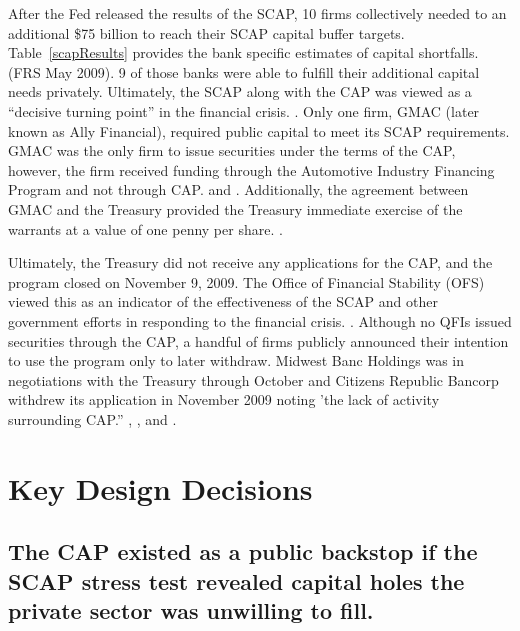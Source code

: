 \documentclass[12pt]{article}
\begin{document}
After the Fed released the results of the SCAP, 10 firms collectively needed to an additional \$75 billion to reach their SCAP capital buffer targets. Table~\ref{scapResults} provides the bank specific estimates of capital shortfalls. (FRS May 2009). 9 of those banks were able to fulfill their additional capital needs privately. Ultimately, the SCAP along with the CAP was viewed as a ``decisive turning point'' in the financial crisis. \citep{Bernanke}. Only one firm, GMAC (later known as Ally Financial), required public capital to meet its SCAP requirements. GMAC was the only firm to issue securities under the terms of the CAP, however, the firm received funding through the Automotive Industry Financing Program and not through CAP. \citep{OFS} and \citep{GW}. Additionally, the agreement between GMAC and the Treasury provided the Treasury immediate exercise of the warrants at a value of one penny per share. \citep{GW}.

Ultimately, the Treasury did not receive any applications for the CAP, and the program closed on November 9, 2009. The Office of Financial Stability (OFS) viewed this as an indicator of the effectiveness of the SCAP and other government efforts in responding to the financial crisis. \citep{OFS}. Although no QFIs issued securities through the CAP, a handful of firms publicly announced their intention to use the program only to later withdraw. Midwest Banc Holdings was in negotiations with the Treasury through October and Citizens Republic Bancorp withdrew its application in November 2009 noting 'the lack of activity surrounding CAP.'' \citep{GW}, \citep{Citizens}, and \citep{Midwest}. 

\newpage
\section{Key Design Decisions}

\subsection{The CAP existed as a public backstop if the SCAP stress test revealed capital holes the private sector was unwilling to fill.}
\end{document}
